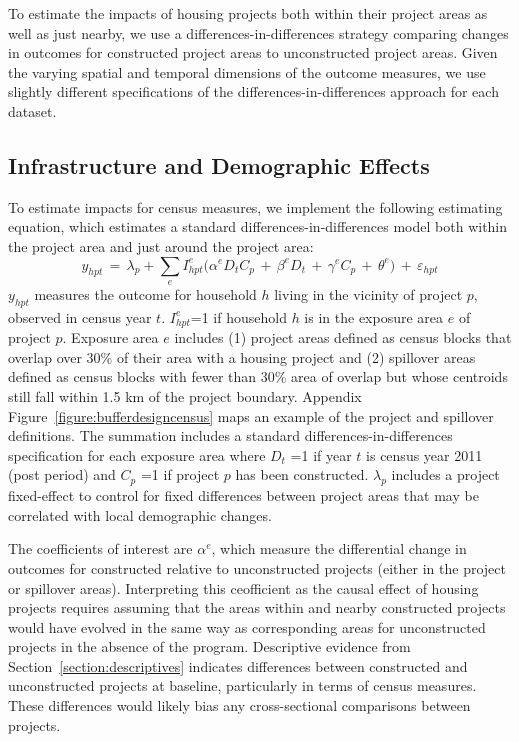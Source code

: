 \documentclass[12pt]{article}
\begin{document}
To estimate the impacts of housing projects both within their project areas as well as just nearby, we use a differences-in-differences strategy comparing changes in outcomes for constructed project areas to unconstructed project areas.  Given the varying spatial and temporal dimensions of the outcome measures, we use slightly different specifications of the differences-in-differences approach for each dataset.

\subsection{Infrastructure and Demographic Effects}\label{section:resultscensus}

To estimate impacts for census measures, we implement the following estimating equation, which estimates a standard differences-in-differences model both within the project area and just around the project area:
\begin{equation*}
y_{hpt} \, = \, \lambda_p + \sum\limits_{e} I^e_{hpt}\Big( \alpha^e D_tC_p \, + \, \beta^eD_t \, + \, \gamma^eC_p \, + \, \theta^e \Big) \, + \, \varepsilon_{hpt}
\end{equation*}
$y_{hpt}$ measures the outcome for household $h$ living in the vicinity of project $p$, observed in census year $t$.  $I^e_{hpt}$=1 if household $h$ is in the exposure area $e$ of project $p$.  Exposure area $e$ includes (1) project areas defined as census blocks that overlap over 30\% of their area with a housing project and (2) spillover areas defined as census blocks with fewer than 30\% area of overlap but whose centroids still fall within 1.5 km of the project boundary.  Appendix Figure~\ref{figure:bufferdesigncensus} maps an example of the project and spillover definitions.  The summation includes a standard differences-in-differences specification for each exposure area where $D_{t}\,\,$=1 if year $t$ is census year 2011 (post period) and $C_{p}\,\,$=1 if project $p$ has been constructed.  $\lambda_p$ includes a project fixed-effect to control for fixed differences between project areas that may be correlated with local demographic changes.  

The coefficients of interest are $\alpha^e$, which measure the differential change in outcomes for constructed relative to unconstructed projects (either in the project or spillover areas).  Interpreting this ceofficient as the causal effect of housing projects requires assuming that the areas within and nearby constructed projects would have evolved in the same way as corresponding areas for unconstructed projects in the absence of the program.  Descriptive evidence from Section~\ref{section:descriptives} indicates differences between constructed and unconstructed projects at baseline, particularly in terms of census measures.  These differences would likely bias any cross-sectional comparisons between projects.  
\end{document}
